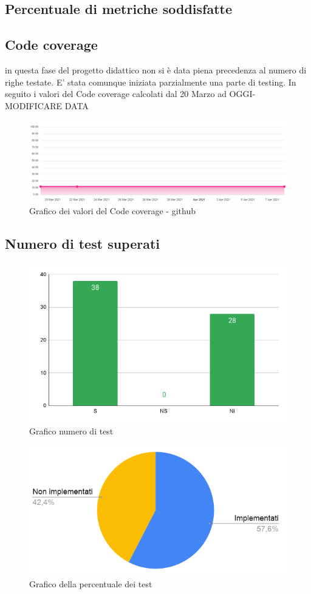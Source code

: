 \subsection{Percentuale di metriche soddisfatte}

\subsection{Code coverage}
in questa fase del progetto didattico non si è data piena precedenza al numero di righe testate. E' stata comunque
iniziata parzialmente una parte di testing. In seguito i valori del Code coverage calcolati dal 20 Marzo ad OGGI-MODIFICARE DATA
\begin{figure}[H]
    \centering
    \includegraphics[width=16 cm]{source/sections/images/CodeCoverage.png}
    \caption{Grafico dei valori del Code coverage - github}
\end{figure}


\subsection{Numero di test superati}

\begin{figure}[H]
    \centering
    \includegraphics[width=10 cm]{source/sections/images/num-test.png}
    \caption{Grafico numero di test}
\end{figure}

\begin{figure}[H]
    \centering
    \includegraphics[width=10 cm]{source/sections/images/torta-test.png}
    \caption{Grafico della percentuale dei test}
\end{figure}

